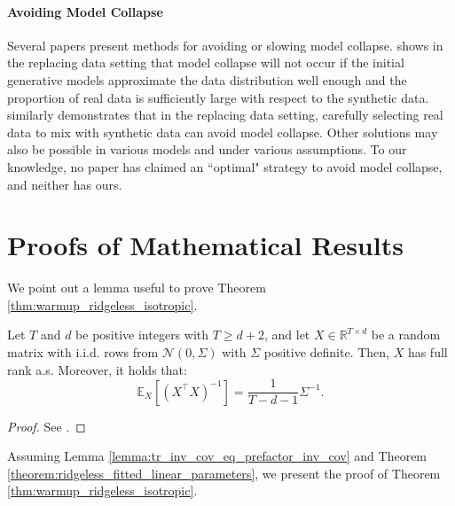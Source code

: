 \paragraph{Avoiding Model Collapse} Several papers present methods for avoiding or slowing model collapse. \citet{bertrand2023stability} shows in the replacing data setting that model collapse will not occur if the initial generative models approximate the data distribution well enough and the proportion of real data is sufficiently large with respect to the synthetic data.
\citet{dohmatob2024tale} similarly demonstrates that in the replacing data setting, carefully selecting real data to mix with synthetic data can avoid model collapse. Other solutions may also be possible in various models and under various assumptions. To our knowledge, no paper has claimed an ``optimal" strategy to avoid model collapse, and neither has ours.


\clearpage
\section{Proofs of Mathematical Results}
\label{app:sec:proofs}

We point out a lemma useful to prove Theorem \ref{thm:warmup_ridgeless_isotropic}.
\begin{lemma}
Let $T$ and $d$ be positive integers with $T \geq d + 2$, and let $X \in \mathbb{R}^{T \times d}$ be a random matrix with i.i.d. rows from $\mathcal{N}(0, \Sigma)$ with $\Sigma$ positive definite. Then, $X$ has full rank a.s. Moreover, it holds that:
\begin{equation}
\mathbb{E}_X[(X^\top X)^{-1}] = \frac{1}{T - d - 1} \Sigma^{-1}.
\end{equation}
\label{lemma:tr_inv_cov_eq_prefactor_inv_cov}
\end{lemma}

\begin{proof}
    See \citet{dohmatob2024model}.
\end{proof}

Assuming Lemma \ref{lemma:tr_inv_cov_eq_prefactor_inv_cov} and Theorem \ref{theorem:ridgeless_fitted_linear_parameters}, we present the proof of Theorem \ref{thm:warmup_ridgeless_isotropic}.

